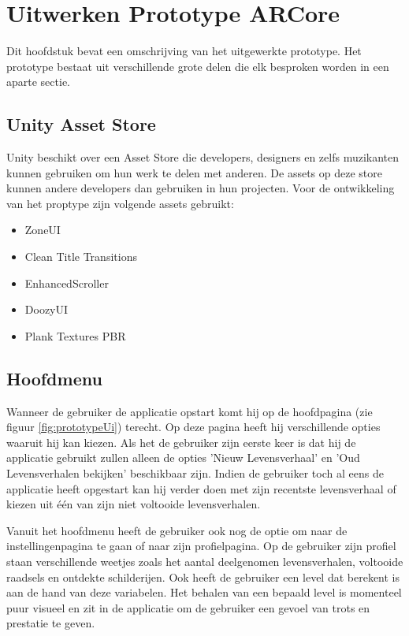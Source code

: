 \chapter{Uitwerken Prototype ARCore}
\label{ch:prototype}

Dit hoofdstuk bevat een omschrijving van het uitgewerkte prototype. Het prototype bestaat uit verschillende grote delen die elk besproken worden in een aparte sectie.

\section{Unity Asset Store}
Unity beschikt over een Asset Store die developers, designers en zelfs muzikanten kunnen gebruiken om hun werk te delen met anderen. De assets op deze store kunnen andere developers dan gebruiken in hun projecten. Voor de ontwikkeling van het proptype zijn volgende assets gebruikt:

\begin{itemize}
    \item ZoneUI \autocite{MichskyZone}
    \item Clean Title Transitions \autocite{MichskyTitle}
    \item EnhancedScroller \autocite{EchoScroller}
    \item DoozyUI \autocite{DoozyUI}
    \item Plank Textures PBR \autocite{UnityWood}
\end{itemize}

\section{Hoofdmenu}
Wanneer de gebruiker de applicatie opstart komt hij op de hoofdpagina (zie figuur \ref{fig:prototypeUi}) terecht. Op deze pagina heeft hij verschillende opties waaruit hij kan kiezen. Als het de gebruiker zijn eerste keer is dat hij de applicatie gebruikt zullen alleen de opties 'Nieuw Levensverhaal' en 'Oud Levensverhalen bekijken' beschikbaar zijn. Indien de gebruiker toch al eens de applicatie heeft opgestart kan hij verder doen met zijn recentste levensverhaal of kiezen uit één van zijn niet voltooide levensverhalen. 

Vanuit het hoofdmenu heeft de gebruiker ook nog de optie om naar de instellingenpagina te gaan of naar zijn profielpagina. Op de gebruiker zijn profiel staan verschillende weetjes zoals het aantal deelgenomen levensverhalen, voltooide raadsels en ontdekte schilderijen. Ook heeft de gebruiker een level dat berekent is aan de hand van deze variabelen. Het behalen van een bepaald level is momenteel puur visueel en zit in de applicatie om de gebruiker een gevoel van trots en prestatie te geven.


